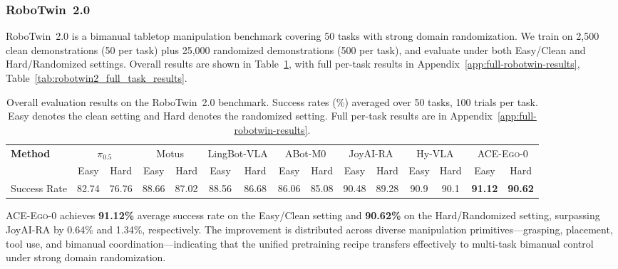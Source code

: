 \documentclass{article}
\newcommand{\OURS}{\textsc{ACE-Ego-0}\xspace}
\newcommand{\Ours}{\OURS}
\begin{document}
\subsubsection{RoboTwin~2.0}
\label{sec:robotwin}

RoboTwin~2.0 is a bimanual tabletop manipulation benchmark covering 50 tasks with strong domain randomization. 
We train on 2,500 clean demonstrations (50 per task) plus 25,000 randomized demonstrations (500 per task), and evaluate under both Easy/Clean and Hard/Randomized settings. Overall results are shown in Table~\ref{tab:robotwin2_results}, with full per-task results in Appendix~\ref{app:full-robotwin-results}, Table~\ref{tab:robotwin2_full_task_results}.

\begin{table}[t]
\centering
\caption{Overall evaluation results on the RoboTwin~2.0 benchmark. Success rates (\%) averaged over 50 tasks, 100 trials per task. Easy denotes the clean setting and Hard denotes the randomized setting. Full per-task results are in Appendix~\ref{app:full-robotwin-results}.}
\label{tab:robotwin2_results}
\vspace{0.3em}
\small
\renewcommand{\arraystretch}{1.1}
\setlength{\tabcolsep}{3pt}
\begin{tabular*}{\textwidth}{@{\extracolsep{\fill}}lcccccccccccccc}
\hline
\textbf{Method} & \multicolumn{2}{c}{$\pi_{0.5}$} & \multicolumn{2}{c}{Motus} & \multicolumn{2}{c}{LingBot-VLA} & \multicolumn{2}{c}{ABot-M0} & \multicolumn{2}{c}{JoyAI-RA} & \multicolumn{2}{c}{Hy-VLA} &\multicolumn{2}{c}{\Ours} \\
 & Easy & Hard & Easy & Hard & Easy & Hard & Easy & Hard & Easy & Hard & Easy & Hard & Easy & Hard \\
\hline
Success Rate & 82.74 & 76.76 & 88.66 & 87.02 & 88.56 & 86.68 & 86.06 & 85.08 & 90.48 & 89.28 & 90.9 & 90.1 & \textbf{91.12} & \textbf{90.62} \\
\hline
\end{tabular*}
\end{table}

\Ours achieves \textbf{91.12\%} average success rate on the Easy/Clean setting and \textbf{90.62\%} on the Hard/Randomized setting, surpassing JoyAI-RA by 0.64\% and 1.34\%, respectively.
The improvement is distributed across diverse manipulation primitives---grasping, placement, tool use, and bimanual coordination---indicating that the unified pretraining recipe transfers effectively to multi-task bimanual control under strong domain randomization.
\end{document}
